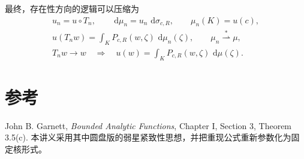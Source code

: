 \documentclass[11pt,a4paper]{article}
\theoremstyle{cnplain}
\theoremstyle{definition}
\newcommand{\dd}{\,\mathrm d}
\newcommand{\weakto}{\mathrel{\stackrel{*}{\rightharpoonup}}}
\begin{document}
最终，存在性方向的逻辑可以压缩为
\[
\boxed{
\begin{gathered}
  u_n=u\circ T_n,
  \qquad \dd\mu_n=u_n\,\dd\sigma_{c,R},
  \qquad \mu_n(K)=u(c),\\[2mm]
  u(T_nw)=\int_K P_{c,R}(w,\zeta)\,\dd\mu_n(\zeta),
  \qquad \mu_n\weakto\mu,\\[2mm]
  T_nw\to w
  \quad\Longrightarrow\quad
  u(w)=\int_K P_{c,R}(w,\zeta)\,\dd\mu(\zeta).
\end{gathered}}
\]

\section*{参考}

John B. Garnett, \textit{Bounded Analytic Functions}, Chapter I, Section 3,
Theorem 3.5(c). 本讲义采用其中圆盘版的弱星紧致性思想，并把重现公式重新参数化为固定核形式。
\end{document}

